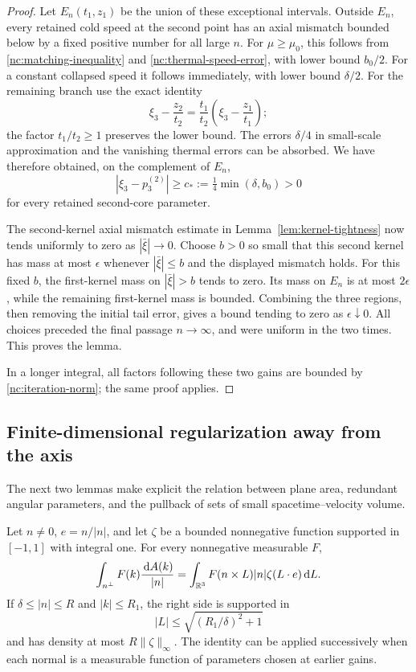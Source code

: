 \begin{proof}
Let \(E_n(t_1,z_1)\) be the union of these exceptional intervals.
Outside \(E_n\), every retained cold speed at the second point has
an axial mismatch bounded below by a fixed positive number for
all large \(n\).  For \(\mu\ge\mu_0\), this follows from
\eqref{nc:matching-inequality} and
\eqref{nc:thermal-speed-error}, with lower bound \(b_0/2\).
For a constant collapsed speed it follows immediately, with lower
bound \(\delta/2\).  For the remaining branch use the exact identity
\[
 \xi_3-\frac{z_2}{t_2}
 =\frac{t_1}{t_2}
       \left(\xi_3-\frac{z_1}{t_1}\right);
\]
the factor \(t_1/t_2\ge1\) preserves the lower bound.
The errors \(\delta/4\) in small-scale approximation and the
vanishing thermal errors can be absorbed.  We have therefore
obtained, on the complement of \(E_n\),
\[
 |\xi_3-p_3^{(2)}|
 \ge c_*:=\tfrac14\min(\delta,b_0)>0
\]
for every retained second-core parameter.

The second-kernel axial mismatch estimate in
Lemma~\ref{lem:kernel-tightness} now tends uniformly to zero as
\(|\bar\xi|\to0\).  Choose \(b>0\) so small that this second
kernel has mass at most \(\epsilon\) whenever
\(|\bar\xi|\le b\) and the displayed mismatch holds.
For this fixed \(b\), the first-kernel mass on
\(|\bar\xi|>b\) tends to zero.  Its mass on \(E_n\) is at most
\(2\epsilon\), while the remaining first-kernel mass is bounded.
Combining the three regions, then removing the initial tail error,
gives a bound tending to zero as \(\epsilon\downarrow0\).
All choices preceded the final passage \(n\to\infty\), and were
uniform in the two times.  This proves the lemma.

In a longer integral, all factors following these two gains are
bounded by \eqref{nc:iteration-norm}; the same proof applies.
\end{proof}

\subsection{Finite-dimensional regularization away from the axis}

The next two lemmas make explicit the relation between plane area,
redundant angular parameters, and the pullback of sets of small
spacetime--velocity volume.

\begin{lemma}
\label{nc:plane-parameters}
Let \(n\ne0\), \(e=n/|n|\), and let \(\zeta\) be a bounded
nonnegative function supported in \([-1,1]\) with integral one.
For every nonnegative measurable \(F\),
\begin{equation}
\label{nc:plane-identity}
 \int_{n^\perp} F(k)\frac{\,\mathrm d A(k)}{|n|}
 =
 \int_{\mathbb R^3}F(n\times L)|n|\zeta(L\cdot e)\,\mathrm d L .
\end{equation}
If \(\delta\le|n|\le R\) and \(|k|\le R_1\), the right side is
supported in
\[
 |L|\le\sqrt{(R_1/\delta)^2+1}
\]
and has density at most \(R\|\zeta\|_\infty\).
The identity can be applied successively when each normal is a
measurable function of parameters chosen at earlier gains.
\end{lemma}

